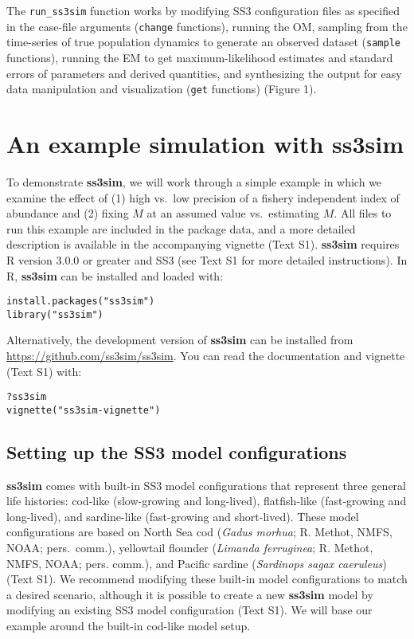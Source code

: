 \documentclass[11pt]{article}
\begin{document}
\begin{spacing}{1.2}
The \texttt{run\_ss3sim} function works by modifying SS3 configuration files as
specified in the case-file arguments (\texttt{change} functions), running the
OM, sampling from the time-series of true population dynamics to generate an
observed dataset (\texttt{sample} functions), running the EM to get
maximum-likelihood estimates and standard errors of parameters and
derived quantities, and synthesizing the output for easy data
manipulation and visualization (\texttt{get} functions) (Figure 1).

\section*{An example simulation with ss3sim}

To demonstrate \textbf{ss3sim}, we will work through a simple example in which
we examine the effect of (1) high vs.~low precision of a fishery independent
index of abundance and (2) fixing $M$ at an assumed value vs.~estimating
$M$. All files to run this example are included in the package data, and a more
detailed description is available in the accompanying vignette (Text S1).
\textbf{ss3sim} requires \textsf{R} version 3.0.0 or greater and SS3 (see Text
S1 for more detailed instructions). In \textsf{R}, \textbf{ss3sim} can be
installed and loaded with:

\begin{verbatim}
install.packages("ss3sim")
library("ss3sim")
\end{verbatim}

\noindent
Alternatively, the development version of \textbf{ss3sim} can be installed from
\url{https://github.com/ss3sim/ss3sim}. You can read the documentation and
vignette (Text S1) with:

\begin{verbatim}
?ss3sim
vignette("ss3sim-vignette")
\end{verbatim}

\subsection*{Setting up the SS3 model configurations}

\textbf{ss3sim} comes with built-in SS3 model configurations that represent
three general life histories: cod-like (slow-growing and long-lived),
flatfish-like (fast-growing and long-lived), and sardine-like (fast-growing and
short-lived). These model configurations are based on North Sea cod
(\emph{Gadus morhua}; R. Methot, NMFS, NOAA; pers.~comm.), yellowtail flounder
(\emph{Limanda ferruginea}; R. Methot, NMFS, NOAA; pers. comm.), and Pacific
sardine (\emph{Sardinops sagax caeruleus}) \cite{hill2012} (Text S1). We
recommend modifying these built-in model configurations to match a desired
scenario, although it is possible to create a new \textbf{ss3sim} model by
modifying an existing SS3 model configuration (Text S1). We will base our
example around the built-in cod-like model setup.


\end{spacing}
\end{document}
